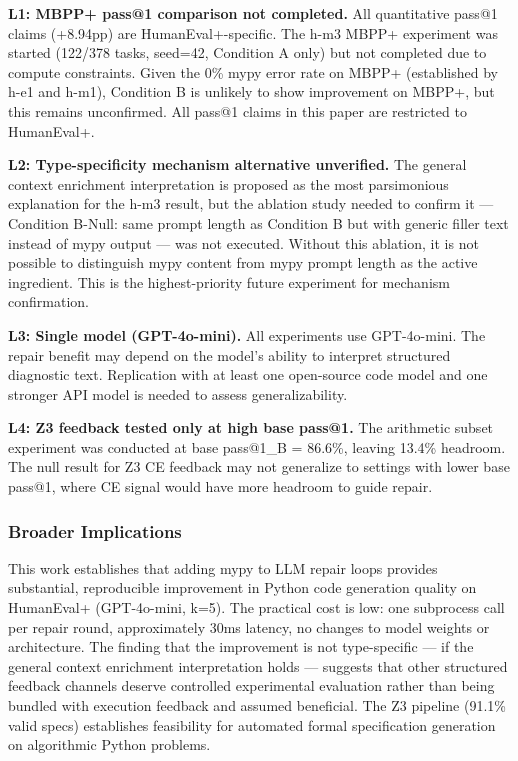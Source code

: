 \textbf{L1: MBPP+ pass@1 comparison not completed.} All quantitative pass@1 claims (+8.94pp) are HumanEval+-specific. The h-m3 MBPP+ experiment was started (122/378 tasks, seed=42, Condition A only) but not completed due to compute constraints. Given the 0\% mypy error rate on MBPP+ (established by h-e1 and h-m1), Condition B is unlikely to show improvement on MBPP+, but this remains unconfirmed. All pass@1 claims in this paper are restricted to HumanEval+.

\textbf{L2: Type-specificity mechanism alternative unverified.} The general context enrichment interpretation is proposed as the most parsimonious explanation for the h-m3 result, but the ablation study needed to confirm it --- Condition B-Null: same prompt length as Condition B but with generic filler text instead of mypy output --- was not executed. Without this ablation, it is not possible to distinguish mypy content from mypy prompt length as the active ingredient. This is the highest-priority future experiment for mechanism confirmation.

\textbf{L3: Single model (GPT-4o-mini).} All experiments use GPT-4o-mini. The repair benefit may depend on the model's ability to interpret structured diagnostic text. Replication with at least one open-source code model and one stronger API model is needed to assess generalizability.

\textbf{L4: Z3 feedback tested only at high base pass@1.} The arithmetic subset experiment was conducted at base pass@1\_B = 86.6\%, leaving 13.4\% headroom. The null result for Z3 CE feedback may not generalize to settings with lower base pass@1, where CE signal would have more headroom to guide repair.

\subsubsection{Broader Implications}

This work establishes that adding mypy to LLM repair loops provides substantial, reproducible improvement in Python code generation quality on HumanEval+ (GPT-4o-mini, k=5). The practical cost is low: one subprocess call per repair round, approximately 30ms latency, no changes to model weights or architecture. The finding that the improvement is not type-specific --- if the general context enrichment interpretation holds --- suggests that other structured feedback channels deserve controlled experimental evaluation rather than being bundled with execution feedback and assumed beneficial. The Z3 pipeline (91.1\% valid specs) establishes feasibility for automated formal specification generation on algorithmic Python problems.

